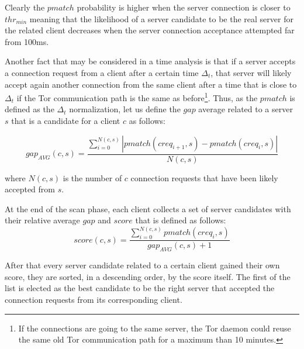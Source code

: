 Clearly the $pmatch$ probability is higher when the server connection is
closer to $thr_{min}$ meaning that the likelihood of a server
candidate to be the real server for the related client decreases when
the server connection acceptance attempted far from 100ms.                                      %

Another fact that may be considered in a time analysis is that if a server accepts a
connection request from a client after a certain time $\Delta_t$, that
server will likely accept again another connection from the same client
after a time that is close to $\Delta_t$ if the Tor communication path is the same as
before\footnote{If the connections are going to the same server, the Tor
daemon could reuse the same old Tor communication path for a maximum
than 10 minutes\cite{tormanual}.}.                                                              %
Thus, as the $pmatch$ is defined as the $\Delta_t$ normalization, 
let us define the $gap$ average related to a                                                    %
server $s$ that is a candidate for a client $c$ as follows:

\begin{equation}
\label{eq:gap}
 gap_{AVG}(c,s) = \frac{\sum_{i=0}^{N(c,s)} | pmatch(creq_{i+1},s) -
pmatch(creq_{i},s)
|}{N(c,s)}
\end{equation}

where $N(c,s)$ is the number of $c$ connection requests that have been likely                   %
accepted from $s$.


At the end of the scan phase, each client collects a set of server
candidates with their relative average $gap$ and $score$ that is defined
as follows:
\begin{equation}
	score(c,s) = \frac{\sum_{i=0}^{N(c,s)} pmatch(creq_{i},s)}{gap_{AVG}(c,s) + 1}
\end{equation}

After that every server candidate related to a certain client gained
their own score, they are sorted, in a descending order, by the score                           %
itself. The first of the list is elected as the best candidate to be the
right server that accepted the connection requests from its corresponding
client.

